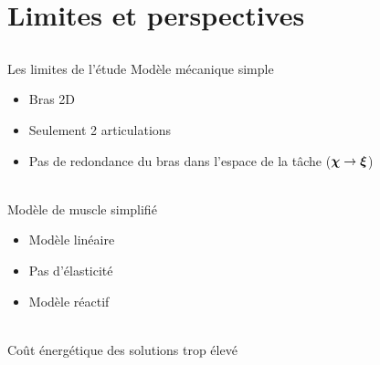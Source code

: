\section{Limites et perspectives}

\subsection{}

\begin{frame}{Les limites de l'étude}
    Modèle mécanique simple
    \begin{itemize}
        \item Bras 2D
        \item Seulement 2 articulations
        \item Pas de redondance du bras dans l'espace de la tâche ($\boldsymbol{\chi} \rightarrow \boldsymbol{\xi}$)
    \end{itemize}
    ~\\
    Modèle de muscle simplifié
    \begin{itemize}
        \item Modèle linéaire
        \item Pas d'élasticité
        \item Modèle réactif
    \end{itemize}
    ~\\
    Coût énergétique des solutions trop élevé
\end{frame}

